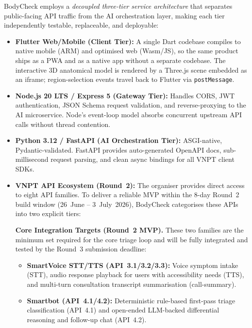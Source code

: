 BodyCheck employs a \emph{decoupled three-tier service architecture} that
separates public-facing API traffic from the AI orchestration layer, making
each tier independently testable, replaceable, and deployable:

\begin{itemize}[leftmargin=2em, itemsep=2pt, topsep=4pt]
  \item \textbf{Flutter Web/Mobile (Client Tier):}
        A single Dart codebase compiles to native mobile (ARM) and
        optimised web (Wasm/JS), so the same product ships as a PWA and
        as a native app without a separate codebase. The interactive 3D
        anatomical model is rendered by a Three.js scene embedded as an
        iframe; region-selection events travel back to Flutter via
        \texttt{postMessage}.
  \item \textbf{Node.js 20 LTS / Express 5 (Gateway Tier):}
        Handles CORS, JWT authentication, JSON Schema request validation,
        and reverse-proxying to the AI microservice. Node's event-loop
        model absorbs concurrent upstream API calls without thread contention.
  \item \textbf{Python 3.12 / FastAPI (AI Orchestration Tier):}
        ASGI-native, Pydantic-validated. FastAPI provides auto-generated
        OpenAPI docs, sub-millisecond request parsing, and clean async
        bindings for all VNPT client SDKs.
  \item \textbf{VNPT API Ecosystem (Round~2):}
        The organiser provides direct access to eight API families.
        To deliver a reliable MVP within the 8-day Round~2 build window
        (26~June -- 3~July~2026), BodyCheck categorises these APIs into
        two explicit tiers:

        \textbf{Core Integration Targets (Round~2 MVP).}
        These two families are the minimum set required for the core
        triage loop and will be fully integrated and tested by the
        Round~3 submission deadline:
        \begin{itemize}[leftmargin=3em, itemsep=1pt, topsep=2pt]
          \item \textbf{SmartVoice STT/TTS (API~3.1/3.2/3.3):}
                Voice symptom intake (STT), audio response playback for
                users with accessibility needs (TTS), and multi-turn
                consultation transcript summarisation (call-summary).
          \item \textbf{Smartbot (API~4.1/4.2):}
                Deterministic rule-based first-pass triage classification
                (API~4.1) and open-ended LLM-backed differential reasoning
                and follow-up chat (API~4.2).
        \end{itemize}


\end{itemize}

